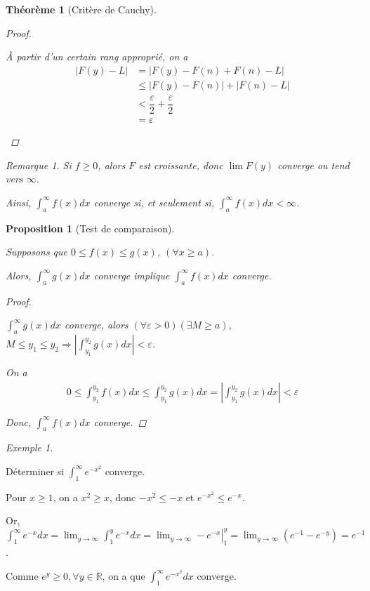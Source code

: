 \documentclass{report}
\newcommand*{\dlim}[3]{\displaystyle\lim_{#1 \to #2}#3}
\newcommand*{\dint}[3]{\displaystyle\int_{#1}^{#2}#3}
\newcommand*{\abs}[1]{\left| #1 \right|}
\newcommand*{\eps}{\varepsilon}
\newcommand*{\lte}{\leqslant}
\newcommand*{\gte}{\geqslant}
\newcommand*{\reels}{\mathbb{R}}
\newtheorem*{thm}{Th\'eor\`eme}
\newtheorem*{prop}{Proposition}
\theoremstyle{definition}
\theoremstyle{remark}
\newtheorem*{exem}{Exemple}
\newtheorem*{rema}{Remarque}
\begin{document}
\begin{thm}[Crit\`ere de Cauchy]
\begin{proof}
\begin{itemize}
				\`A partir d'un certain rang appropri\'e, on a
				\begin{align*}
					\abs{F(y)-L}&= \abs{F(y) - F(n) + F(n) - L}\\
					&\lte \abs{F(y)-F(n)} + \abs{F(n)-L}\\
					&< \dfrac{\eps}{2} + \dfrac{\eps}{2}\\
					&= \eps
				\end{align*}
			\end{itemize}
		\end{proof}
		\begin{rema}
		Si $f \gte 0$, alors $F$ est croissante, donc $\lim F(y)$ converge ou tend vers $\infty$.

		Ainsi, $\dint{a}{\infty}{f(x)dx}$ converge si, et seulement si, $\dint{a}{\infty}{f(x)dx} < \infty$.
		\end{rema}
	\end{thm}
	\begin{prop}[Test de comparaison]~

		Supposons que $0 \lte f(x) \lte g(x)$, $(\forall x \gte a)$.

		Alors, $\dint{a}{\infty}{g(x)dx}$ converge implique $\dint{a}{\infty}{f(x)dx}$ converge.
		\begin{proof}~

			$\dint{a}{\infty}{g(x)dx}$ converge, alors $(\forall\eps>0) (\exists M \gte a)$, $M \lte y_1 \lte y_2 \Rightarrow \abs{\dint{y_1}{y_2}{g(x)dx}}<\eps$.

			On a
			\begin{align*}
				0 \lte \dint{y_1}{y_2}{f(x)dx} \lte \dint{y_1}{y_2}{g(x)dx} = \abs{\dint{y_1}{y_2}{g(x)dx}} < \eps
			\end{align*}

			Donc, $\dint{a}{\infty}{f(x)dx}$ converge.
		\end{proof}
	\end{prop}
	\begin{exem}
		~

		D\'eterminer si $\dint{1}{\infty}{e^{-x^2}}$ converge.

		Pour $x \gte 1$, on a $x^2 \gte x$, donc $-x^2 \lte -x$ et $e^{-x^2} \lte e^{-x}$.

		Or, $\dint{1}{\infty}{e^{-x}dx} = \dlim{y}{\infty}{\dint{1}{y}{e^{-x}dx}} = \left. \dlim{y}{\infty}{-e^{-x}} \right|^y_1 = \dlim{y}{\infty}{(e^{-1} - e^{-y})} = e^{-1}$.

		Comme $e^y \gte 0, \forall y \in \reels$, on a que $\dint{1}{\infty}{e^{-x^2}dx}$ converge.
	\end{exem}
\end{document}
